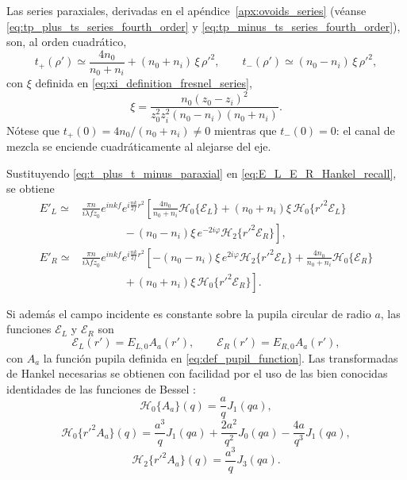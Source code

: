 Las series paraxiales, derivadas en el apéndice~\ref{apx:ovoids_series} (véanse \eqref{eq:tp_plus_ts_series_fourth_order} y \eqref{eq:tp_minus_ts_series_fourth_order}), son, al orden cuadrático,
\begin{equation}
t_+(\rho')
\simeq
\frac{4n_0}{n_0+n_i}
+
(n_0+n_i)\,\xi\,\rho'^2,
\qquad
t_-(\rho')
\simeq
(n_0-n_i)\,\xi\,\rho'^2,
\label{eq:t_plus_t_minus_paraxial}
\end{equation}
con $\xi$ definida en \eqref{eq:xi_definition_fresnel_series},
\begin{equation}
\xi
=
\frac{
n_0(z_0-z_i)^2
}{
z_0^2 z_i^2 (n_0-n_i)(n_0+n_i)
}.
\label{eq:xi_focal_forms}
\end{equation}
Nótese que $t_+(0)=4n_0/(n_0+n_i)\neq 0$ mientras que $t_-(0)=0$: el canal de mezcla se enciende cuadráticamente al alejarse del eje.

Sustituyendo \eqref{eq:t_plus_t_minus_paraxial} en \eqref{eq:E_L_E_R_Hankel_recall}, se obtiene
\begin{equation}
\begin{aligned}
E'_L
\simeq{}&
\frac{\pi n}{i\lambda f z_0}
e^{inkf}
e^{i\frac{nk}{2f}r^2}
\left[
\frac{4n_0}{n_0+n_i}\mathscr H_0\{\mathscr E_L\}
+
(n_0+n_i)\xi\,\mathscr H_0\{r'^2\mathscr E_L\}
\right.
\\
&\qquad\qquad
\left.
-\,
(n_0-n_i)\xi\,e^{-2i\varphi}\mathscr H_2\{r'^2\mathscr E_R\}
\right],
\\[1em]
E'_R
\simeq{}&
\frac{\pi n}{i\lambda f z_0}
e^{inkf}
e^{i\frac{nk}{2f}r^2}
\left[
-(n_0-n_i)\xi\,e^{2i\varphi}\mathscr H_2\{r'^2\mathscr E_L\}
+
\frac{4n_0}{n_0+n_i}\mathscr H_0\{\mathscr E_R\}
\right.
\\
&\qquad\qquad
\left.
+\,
(n_0+n_i)\xi\,\mathscr H_0\{r'^2\mathscr E_R\}
\right].
\end{aligned}
\label{eq:E_L_E_R_paraxial}
\end{equation}

Si además el campo incidente es constante sobre la pupila circular de radio $a$, las funciones $\mathscr E_L$ y $\mathscr E_R$ son
\begin{equation}
  \mathscr E_L(r')=E_{L,0}A_a(r'),
  \qquad
  \mathscr E_R(r')=E_{R,0}A_a(r'),
\end{equation}
con $A_a$ la función pupila definida en \eqref{eq:def_pupil_function}. Las transformadas de Hankel necesarias se obtienen con facilidad por el uso de las bien conocidas identidades de las funciones de Bessel \cite{arfken2013}:
\begin{equation}
  \mathscr H_0\{A_a\}(q)
  =
  \frac{a}{q}J_1(qa),
  \label{eq:H0_chiR}
\end{equation}
\begin{equation}
  \mathscr H_0\{r'^2A_a\}(q)
  =
  \frac{a^3}{q}J_1(qa)
  +
  \frac{2a^2}{q^2}J_0(qa)
  -
  \frac{4a}{q^3}J_1(qa),
  \label{eq:H0_rho2_chiR}
\end{equation}
\begin{equation}
  \mathscr H_2\{r'^2A_a\}(q)
  =
  \frac{a^3}{q}J_3(qa).
  \label{eq:H2_rho2_chiR}
\end{equation}

